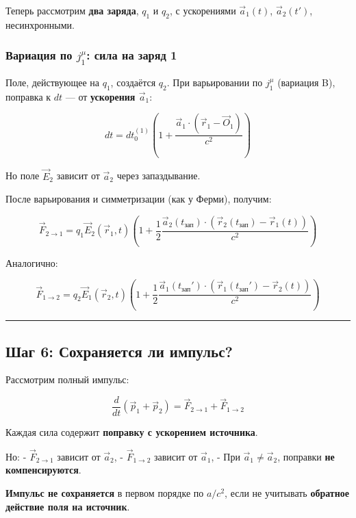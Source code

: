 \documentclass[11pt]{article}
\begin{document}
Теперь рассмотрим \textbf{два заряда}, \(q_1\) и \(q_2\), с ускорениями
\(\vec{a}_1(t)\), \(\vec{a}_2(t')\), несинхронными.

\subsubsection{\texorpdfstring{Вариация по \(j_1^\mu\): сила на заряд
1}{Вариация по j\_1\^{}\textbackslash{}mu: сила на заряд 1}}

Поле, действующее на \(q_1\), создаётся \(q_2\). При варьировании по
\(j_1^\mu\) (вариация B), поправка к \(dt\) --- от \textbf{ускорения
\(\vec{a}_1\)}:

\[
dt = dt_0^{(1)} \left( 1 + \frac{\vec{a}_1 \cdot (\vec{r}_1 - \vec{O}_1)}{c^2} \right)
\]

Но поле \(\vec{E}_2\) зависит от \(\vec{a}_2\) через запаздывание.

После варьирования и симметризации (как у Ферми), получим:

\[
\vec{F}_{2 \to 1} = q_1 \vec{E}_2(\vec{r}_1, t) \left( 1 + \frac{1}{2} \frac{\vec{a}_2(t_{\text{зап}}) \cdot (\vec{r}_2(t_{\text{зап}}) - \vec{r}_1(t))}{c^2} \right)
\]

Аналогично:

\[
\vec{F}_{1 \to 2} = q_2 \vec{E}_1(\vec{r}_2, t) \left( 1 + \frac{1}{2} \frac{\vec{a}_1(t_{\text{зап}}') \cdot (\vec{r}_1(t_{\text{зап}}') - \vec{r}_2(t))}{c^2} \right)
\]

\begin{center}\rule{0.5\linewidth}{\linethickness}\end{center}

\subsection{ Шаг 6: Сохраняется ли импульс?}

Рассмотрим полный импульс:

\[
\frac{d}{dt} (\vec{p}_1 + \vec{p}_2) = \vec{F}_{2 \to 1} + \vec{F}_{1 \to 2}
\]

Каждая сила содержит \textbf{поправку с ускорением источника}.

Но: - \(\vec{F}_{2 \to 1}\) зависит от \(\vec{a}_2\), -
\(\vec{F}_{1 \to 2}\) зависит от \(\vec{a}_1\), - При
\(\vec{a}_1 \ne \vec{a}_2\), поправки \textbf{не компенсируются}.

 \textbf{Импульс не сохраняется} в первом порядке по \(a/c^2\), если не
учитывать \textbf{обратное действие поля на источник}.
\end{document}
